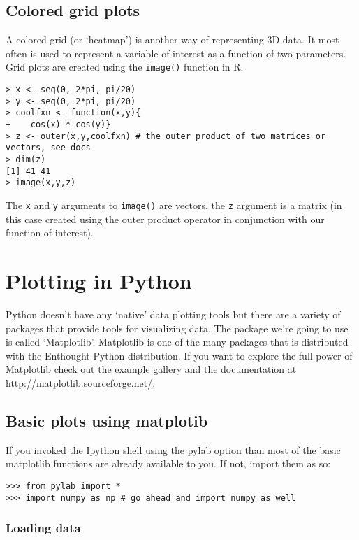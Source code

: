 \documentclass{article}
\begin{document}
\subsection{Colored grid plots}

A colored grid (or `heatmap') is another way of representing 3D data. It
most often is used to represent a variable of interest as a function of
two parameters. Grid plots are created using the \lstinline!image()!
function in R.

\begin{lstlisting}
> x <- seq(0, 2*pi, pi/20)
> y <- seq(0, 2*pi, pi/20)
> coolfxn <- function(x,y){
+    cos(x) * cos(y)}
> z <- outer(x,y,coolfxn) # the outer product of two matrices or vectors, see docs
> dim(z)
[1] 41 41
> image(x,y,z)
\end{lstlisting}
The \lstinline!x! and \lstinline!y! arguments to \lstinline!image()! are
vectors, the \lstinline!z! argument is a matrix (in this case created
using the outer product operator in conjunction with our function of
interest).

\section{Plotting in Python}

Python doesn't have any `native' data plotting tools but there are a
variety of packages that provide tools for visualizing data. The package
we're going to use is called `Matplotlib'. Matplotlib is one of the many
packages that is distributed with the Enthought Python distribution. If
you want to explore the full power of Matplotlib check out the example
gallery and the documentation at
\url{http://matplotlib.sourceforge.net/}.

\subsection{Basic plots using matplotib}

If you invoked the Ipython shell using the pylab option than most of the
basic matplotlib functions are already available to you. If not, import
them as so:

\begin{lstlisting}
>>> from pylab import *
>>> import numpy as np # go ahead and import numpy as well
\end{lstlisting}
\subsubsection{Loading data}
\end{document}
